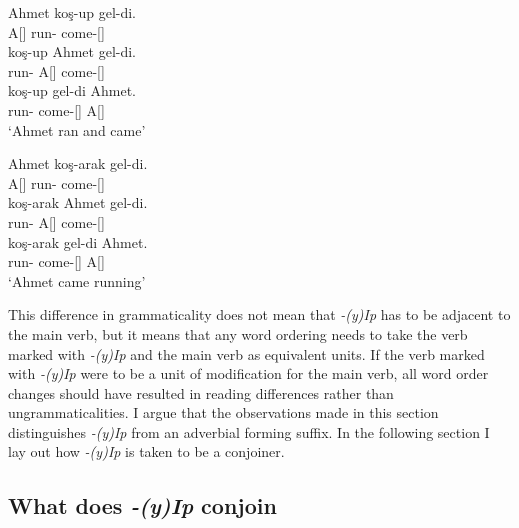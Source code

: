 \begin{exe}
\ex \label{ipandwordorder}
\begin{xlist}
    \ex \begin{xlisti}
        \ex \gll Ahmet koş-up gel-di. \\ 
        A[{\Nom}] run-{\Pc} come-{\Pst}[{\Tsg}] \\
        
        \ex \gll *koş-up Ahmet gel-di. \\ 
        run-{\Pc} A[{\Nom}] come-{\Pst}[{\Tsg}] \\
        
        \ex \gll koş-up gel-di Ahmet. \\ 
        run-{\Pc} come-{\Pst}[{\Tsg}] A[{\Nom}] \\
        \glt `Ahmet ran and came'
    \end{xlisti}
    
    \ex \begin{xlisti}
        \ex \gll Ahmet koş-arak gel-di. \\ 
        A[{\Nom}] run-{\By} come-{\Pst}[{\Tsg}] \\
        
        \ex \gll koş-arak Ahmet gel-di. \\ 
        run-{\By} A[{\Nom}] come-{\Pst}[{\Tsg}] \\
        
        \ex \gll koş-arak gel-di Ahmet. \\ 
        run-{\By} come-{\Pst}[{\Tsg}] A[{\Nom}] \\
        \glt `Ahmet came running'
        \end{xlisti}
    \end{xlist}
\end{exe}

This difference in grammaticality does not mean that \textit{-(y)Ip} has to be adjacent to the main verb, but it means that any word ordering needs to take the verb marked with \textit{-(y)Ip} and the main verb as equivalent units. If the verb marked with \textit{-(y)Ip} were to be a unit of modification for the main verb, all word order changes should have resulted in reading differences rather than ungrammaticalities. I argue that the observations made in this section distinguishes \textit{-(y)Ip} from an adverbial forming suffix. In the following section I lay out how \textit{-(y)Ip} is taken to be a conjoiner.


\subsection{What does \textit{-(y)Ip} conjoin}


